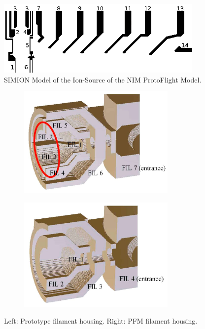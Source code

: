 		\begin{figure}[h] %
			\centering
			\includegraphics[width=0.9\textwidth]{Setup/PFM_IS_sim.png}
			\caption{SIMION Model of the Ion-Source of the NIM ProtoFlight Model.}
			\label{fig:SetupPFMISSim}
		\end{figure}
	
		\begin{figure}[h] %
			\begin{subfigure}{0.5\textwidth}
				\centering
				\includegraphics[width =0.85\textwidth]{Setup/Proto_FilEl_sim.jpg}
			\end{subfigure}
			\begin{subfigure}{0.5\textwidth}
				\centering
				\includegraphics[width = 0.85\textwidth]{Setup/PFM_FilEl_sim.jpg}
			\end{subfigure}
			\caption{Left: Prototype filament housing. Right: PFM filament housing.}
			\label{fig:SetupFilElSim}
		\end{figure}

